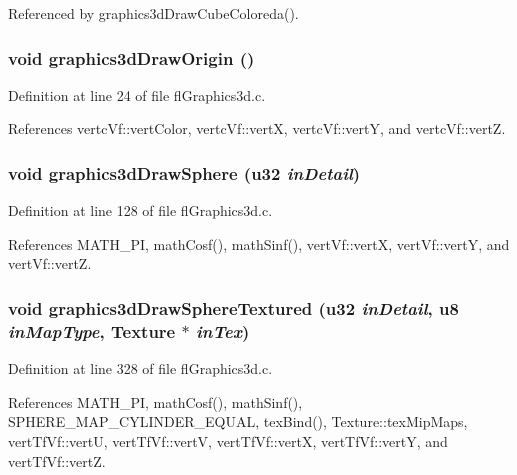Referenced by graphics3d\-Draw\-Cube\-Coloreda().
\subsubsection{\setlength{\rightskip}{0pt plus 5cm}void graphics3d\-Draw\-Origin ()}\label{flGraphics3d_8h_70cda2b57491cf276d3ad0c401f59abd}




Definition at line 24 of file fl\-Graphics3d.c.

References vertc\-Vf::vert\-Color, vertc\-Vf::vert\-X, vertc\-Vf::vert\-Y, and vertc\-Vf::vert\-Z.
\subsubsection{\setlength{\rightskip}{0pt plus 5cm}void graphics3d\-Draw\-Sphere (u32 {\em in\-Detail})}\label{flGraphics3d_8h_43c11eb10953728f60e288499ce1edd8}




Definition at line 128 of file fl\-Graphics3d.c.

References MATH\_\-PI, math\-Cosf(), math\-Sinf(), vert\-Vf::vert\-X, vert\-Vf::vert\-Y, and vert\-Vf::vert\-Z.
\subsubsection{\setlength{\rightskip}{0pt plus 5cm}void graphics3d\-Draw\-Sphere\-Textured (u32 {\em in\-Detail}, u8 {\em in\-Map\-Type}, {\bf Texture} $\ast$ {\em in\-Tex})}\label{flGraphics3d_8h_ef33215a17288686665b4450ba241bfc}




Definition at line 328 of file fl\-Graphics3d.c.

References MATH\_\-PI, math\-Cosf(), math\-Sinf(), SPHERE\_\-MAP\_\-CYLINDER\_\-EQUAL, tex\-Bind(), Texture::tex\-Mip\-Maps, vert\-Tf\-Vf::vert\-U, vert\-Tf\-Vf::vert\-V, vert\-Tf\-Vf::vert\-X, vert\-Tf\-Vf::vert\-Y, and vert\-Tf\-Vf::vert\-Z.